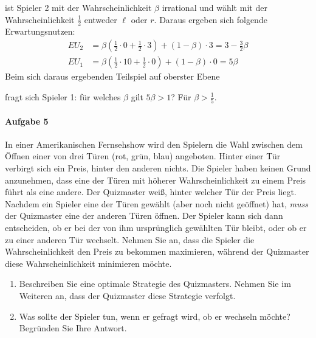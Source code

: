 \begin{enumerate}
\begin{center}
    \end{center}
    ist Spieler 2 mit der Wahrscheinlichkeit $\beta$ irrational und wählt mit der
    Wahrscheinlichkeit $\frac{1}{2}$ entweder $\ell$ oder $r$.
    Daraus ergeben sich folgende Erwartungsnutzen:
    \begin{align*}
      EU_2 & = \beta(\frac{1}{2} \cdot 0 + \frac{1}{2} \cdot 3) + (1-\beta) \cdot 3
             = 3 - \frac{3}{2}\beta\\
      EU_1 & = \beta(\frac{1}{2} \cdot 10 + \frac{1}{2} \cdot 0) + (1-\beta) \cdot 0
             = 5 \beta
    \end{align*}
    Beim sich daraus ergebenden Teilspiel auf oberster Ebene
    \begin{center}
    \end{center}
    fragt sich Spieler 1: für welches $\beta$ gilt $5\beta > 1$?
    Für $\beta > \frac{1}{5}$.
\end{enumerate}

\paragraph{Aufgabe 5}%
\label{par:serie_6_aufgabe_5}

In einer Amerikanischen Fernsehshow wird den Spielern die Wahl zwischen dem Öffnen einer
von drei Türen (rot, grün, blau) angeboten.
Hinter einer Tür verbirgt sich ein Preis, hinter den anderen nichts.
Die Spieler haben keinen Grund anzunehmen, dass eine der Türen mit höherer
Wahrscheinlichkeit zu einem Preis führt als eine andere.
Der Quizmaster weiß, hinter welcher Tür der Preis liegt.
Nachdem ein Spieler eine der Türen gewählt (aber noch nicht geöffnet) hat, \emph{muss} der
Quizmaster eine der anderen Türen öffnen.
Der Spieler kann sich dann entscheiden, ob er bei der von ihm ursprünglich gewählten Tür
bleibt, oder ob er zu einer anderen Tür wechselt.
Nehmen Sie an, dass die Spieler die Wahrscheinlichkeit den Preis zu bekommen maximieren,
während der Quizmaster diese Wahrscheinlichkeit minimieren möchte.

\begin{enumerate}
  \item Beschreiben Sie eine optimale Strategie des Quizmasters.
    Nehmen Sie im Weiteren an, dass der Quizmaster diese Strategie verfolgt.

  \item Was sollte der Spieler tun, wenn er gefragt wird, ob er wechseln möchte?
    Begründen Sie Ihre Antwort.
\end{enumerate}
